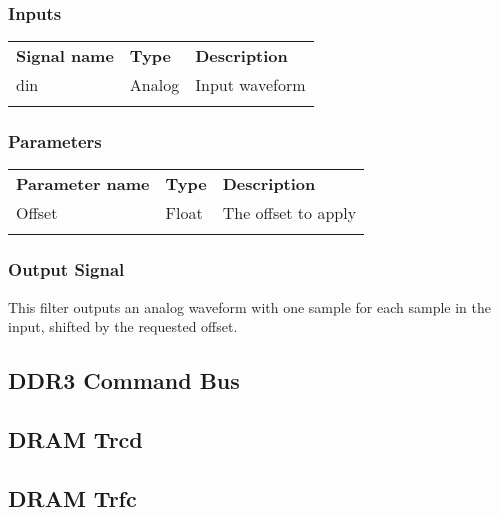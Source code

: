 \subsubsection{Inputs}

\begin{tabularx}{16cm}{llX}
\thickhline
\textbf{Signal name} & \textbf{Type} & \textbf{Description} \\
\thickhline
din & Analog & Input waveform \\
\thickhline
\end{tabularx}

\subsubsection{Parameters}

\begin{tabularx}{16cm}{llX}
\thickhline
\textbf{Parameter name} & \textbf{Type} & \textbf{Description} \\
\thickhline
Offset & Float & The offset to apply \\
\thickhline
\end{tabularx}

\subsubsection{Output Signal}

This filter outputs an analog waveform with one sample for each sample in the input, shifted by the requested offset.

\pagebreak
\subsection{DDR3 Command Bus}

\pagebreak
\subsection{DRAM Trcd}

\pagebreak
\subsection{DRAM Trfc}

